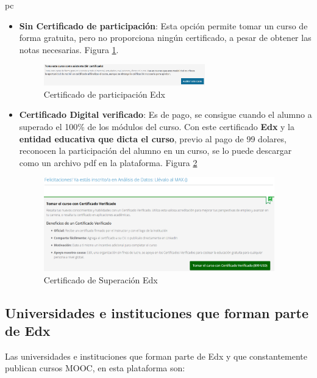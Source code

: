pc\documentclass[a4paper,12pt,openany]{book}
\begin{document}
\begin{itemize}
\item \textbf{Sin Certificado de participación}: Esta opción permite tomar un curso de forma gratuita, pero no proporciona ningún certificado, a pesar de obtener las notas necesarias. Figura \ref{fig:edx7}.  

\begin{figure}[ht]
  \centering
	\includegraphics[width=7cm]{edx6.png}
\caption{Certificado de participación Edx}
  \label{fig:edx7}
\end{figure}

\item \textbf{Certificado Digital verificado}: Es de pago, se consigue cuando el alumno a superado el 100\% de los módulos del curso. Con este certificado \textbf{Edx} y la \textbf{entidad educativa que dicta el curso}, previo al pago de 99 dolares, reconocen la participación del alumno en un curso, se lo puede descargar como un archivo pdf en la plataforma. Figura \ref{fig:edx8}

\begin{figure}[ht]
  \centering
	\includegraphics[width=10cm]{edx5.png}
\caption{Certificado de Superación Edx}
  \label{fig:edx8}
\end{figure}
\end{itemize}


\clearpage
\subsection{Universidades e instituciones que forman parte de Edx}

Las universidades e instituciones que forman parte de Edx y que constantemente publican cursos MOOC, en esta plataforma son:
\end{document}
